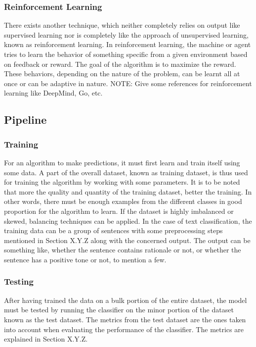 \documentclass[a4paper,12pt,twoside]{report}
\begin{document}
\subsubsection{Reinforcement Learning} 
There exists another technique, which neither completely relies on output like supervised learning nor is completely like the approach of unsupervised learning, known as reinforcement learning. In reinforcement learning, the machine or agent tries to learn the behavior of something specific from a given environment based on feedback or reward. The goal of the algorithm is to maximize the reward. These behaviors, depending on the nature of the problem, can be learnt all at once or can be adaptive in nature. NOTE: Give some references for reinforcement learning like DeepMind, Go, etc.

\subsection{Pipeline}

\subsubsection{Training} 
For an algorithm to make predictions, it must first learn and train itself using some data. A part of the overall dataset, known as training dataset, is thus used for training the algorithm by working with some parameters. It is to be noted that more the quality and quantity of the training dataset, better the training. In other words, there must be enough examples from the different classes in good proportion for the algorithm to learn.  If the dataset is highly imbalanced or skewed, balancing techniques can be applied. In the case of text classification, the training data can be a group of sentences with some preprocessing steps mentioned in Section X.Y.Z along with the concerned output. The output can be something like, whether the sentence contains rationale or not, or whether the sentence has a positive tone or not, to mention a few.

\subsubsection{Testing} 
After having trained the data on a bulk portion of the entire dataset, the model must be tested by running the classifier on the minor portion of the dataset known as the test dataset. The metrics from the test dataset are the ones taken into account when evaluating the performance of the classifier. The metrics are explained in Section X.Y.Z. 
\end{document}
